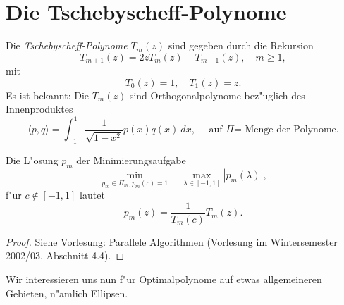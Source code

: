 \section{Die Tschebyscheff-Polynome}
\begin{defn}
Die \emph{Tschebyscheff-Polynome} $ T_m(z) $ sind gegeben durch die Rekursion
\[
T_{m+1}(z)=2zT_m(z)-T_{m-1}(z), \quad m \ge 1,
\]
mit
\[
T_0(z)=1, \quad T_1(z)=z.
\]
Es ist bekannt: Die $T_m(z)$ sind Orthogonalpolynome bez"uglich des Innenproduktes
\[
\langle  p,q\rangle  = \int_{-1}^{1} \frac{1}{\sqrt{1-x^2}}p(x)q(x)\ dx, \quad \text{ auf $\Pi$= Menge der Polynome.}
\]
\end{defn}

\begin{sa}
Die L"osung $p_m$ der Minimierungsaufgabe
\[
\underset{p_m \in \Pi_m, p_m(c)=1}{\min}\quad \underset{\lambda \in [-1,1]}{\max} |p_m(\lambda)|,
\]
f"ur $c \notin [-1,1]$ lautet
\[
p_m(z) = \frac{1}{T_m(c)} T_m(z).
\]
\end{sa}
\begin{proof}
Siehe Vorlesung: Parallele Algorithmen (Vorlesung im Wintersemester 2002/03, Abschnitt 4.4).
\end{proof}

\medskip

Wir interessieren uns nun f"ur Optimalpolynome auf etwas allgemeineren Gebieten, n"amlich Ellipsen.

